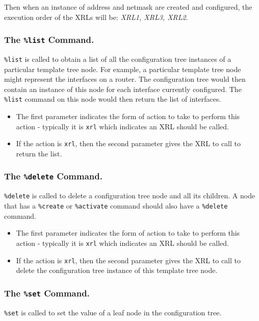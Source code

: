 \documentclass[11pt]{article}
\begin{document}
Then when an instance of address and netmask are created and
configured, the execution order of the XRLs will be: {\it XRL1, XRL3, XRL2}.

\subsubsection{The {\tt \%list} Command.}
{\tt \%list} is called to obtain a list of all the configuration tree
instances of a particular template tree node.  For example, a
particular template tree node might represent the interfaces on a
router.  The configuration tree would then contain an instance of this
node for each interface currently configured.  The {\tt \%list}
command on this node would then return the list of interfaces.

\begin{itemize}
  \item The first parameter indicates the form of action to take to perform
this action - typically it is {\tt xrl} which indicates an XRL should
be called.

  \item If the action is {\tt xrl}, then the second parameter gives the XRL to
call to return the list.

\end{itemize}

\subsubsection{The {\tt \%delete} Command.}
{\tt \%delete} is called to delete a configuration tree node and all its
children.  A node that has a {\tt \%create} or {\tt \%activate}
command should also have a {\tt \%delete} command.

\begin{itemize}
  \item The first parameter indicates the form of action to take to perform
this action - typically it is {\tt xrl} which indicates an XRL should
be called.

  \item If the action is {\tt xrl}, then the second parameter gives the XRL to
call to delete the configuration tree instance of this template tree node.

\end{itemize}

\subsubsection{The {\tt \%set} Command.}
{\tt \%set} is called to set the value of a leaf node in the
configuration tree.
\end{document}
